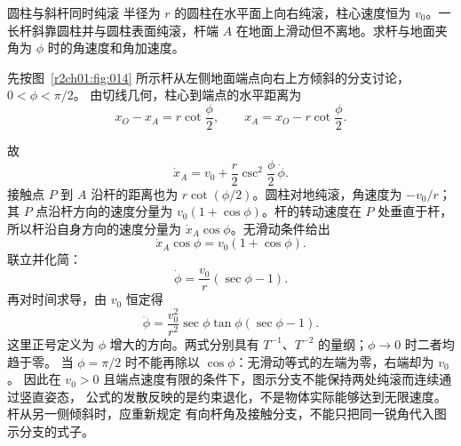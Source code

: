 \begin{practicebox}{圆柱与斜杆同时纯滚}
半径为 $r$ 的圆柱在水平面上向右纯滚，柱心速度恒为 $v_0$。一长杆斜靠圆柱并与圆柱表面纯滚，杆端 $A$ 在地面上滑动但不离地。求杆与地面夹角为 $\phi$ 时的角速度和角加速度。
\label{r2ch01:pr:011}
\begin{solution}
先按图~\ref{r2ch01:fig:014} 所示杆从左侧地面端点向右上方倾斜的分支讨论，$0<\phi<\pi/2$。
由切线几何，柱心到端点的水平距离为
\[
  x_O-x_A=r\cot\frac\phi2,\qquad
  x_A=x_O-r\cot\frac\phi2.
\]

\figRodCylinder

故
\[
  \dot x_A=v_0+\frac r2\csc^2\frac\phi2\,\dot\phi.
\]
接触点 $P$ 到 $A$ 沿杆的距离也为 $r\cot(\phi/2)$。圆柱对地纯滚，角速度为 $-v_0/r$；其 $P$ 点沿杆方向的速度分量为 $v_0(1+\cos\phi)$。杆的转动速度在 $P$ 处垂直于杆，所以杆沿自身方向的速度分量为 $\dot x_A\cos\phi$。无滑动条件给出
\[
  \dot x_A\cos\phi=v_0(1+\cos\phi).
\]
联立并化简：
\[
  \boxed{\dot\phi=\frac{v_0}{r}(\sec\phi-1)}.
\]
再对时间求导，由 $v_0$ 恒定得
\[
  \boxed{\ddot\phi=\frac{v_0^2}{r^2}\sec\phi\tan\phi(\sec\phi-1)}.
\]
这里正号定义为 $\phi$ 增大的方向。两式分别具有 $T^{-1}$、$T^{-2}$ 的量纲；$\phi\to0$ 时二者均趋于零。
当 $\phi=\pi/2$ 时不能再除以 $\cos\phi$：无滑动等式的左端为零，右端却为 $v_0$。
因此在 $v_0>0$ 且端点速度有限的条件下，图示分支不能保持两处纯滚而连续通过竖直姿态，
公式的发散反映的是约束退化，不是物体实际能够达到无限速度。杆从另一侧倾斜时，应重新规定
有向杆角及接触分支，不能只把同一锐角代入图示分支的式子。
\end{solution}
\end{practicebox}


